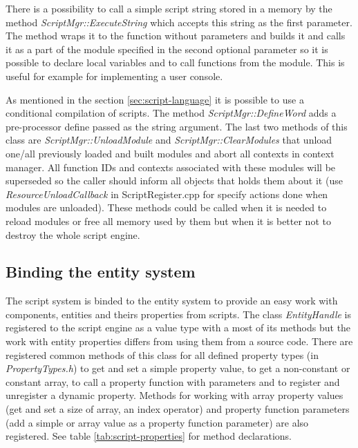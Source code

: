 There is a possibility to call a simple script string stored in a memory by the method \emph{ScriptMgr::ExecuteString} which accepts this string as the first parameter. The method wraps it to the function without parameters and builds it and calls it as a part of the module specified in the second optional parameter so it is possible to declare local variables and to call functions from the module. This is useful for example for implementing a user console.

As mentioned in the section \ref{sec:script-language} it is possible to use a conditional compilation of scripts. The method \emph{ScriptMgr::DefineWord} adds a pre-processor define passed as the string argument. The last two methods of this class are \emph{ScriptMgr::UnloadModule} and \emph{ScriptMgr::ClearModules} that unload one/all previously loaded and built modules and abort all contexts in context manager. All function IDs and contexts associated with these modules will be superseded so the caller should inform all objects that holds them about it (use \emph{ResourceUnloadCallback} in ScriptRegister.cpp for specify actions done when modules are unloaded). These methods could be called when it is needed to reload modules or free all memory used by them but when it is better not to destroy the whole script engine.

\subsection{Binding the entity system}
\label{sub:script-entity}

The script system is binded to the entity system to provide an easy work with components, entities and theirs properties from scripts. The class \emph{EntityHandle} is registered to the script engine as a value type with a most of its methods but the work with entity properties differs from using them from a source code. There are registered common methods of this class for all defined property types (in \emph{PropertyTypes.h}) to get and set a simple property value, to get a non-constant or constant array, to call a property function with parameters and to register and unregister a dynamic property. Methods for working with array property values (get and set a size of array, an index operator) and property function parameters (add a simple or array value as a property function parameter) are also registered. See table \ref{tab:script-properties} for method declarations.

